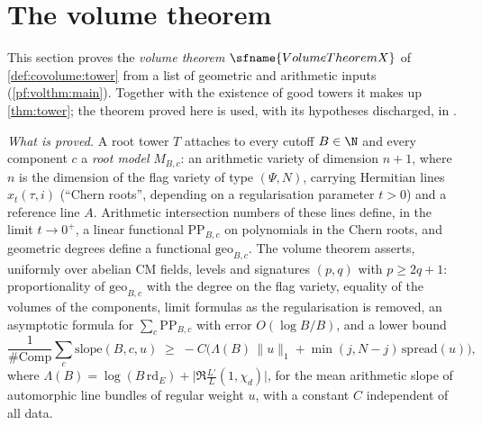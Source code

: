 \section{The volume theorem}\label{sec:pf:volthm}

\providecommand{\volthmdeg}{\deg_{\mathrm{Fl}}}
\providecommand{\volthmlin}{\mathrm{lin}}
\providecommand{\volthmfd}{\mathrm{fdeg}}
\providecommand{\volthmII}{\mathcal{I}}
\providecommand{\volthmhh}{h_{\mathrm{Fl}}}
\providecommand{\volthmSh}{\mathrm{Sh}}
\providecommand{\volthmTot}{\mathrm{Tot}}
\providecommand{\volthmPP}{\mathrm{PP}}
\providecommand{\volthmgap}{\mathrm{gap}}
\providecommand{\volthmR}{\mathcal{R}}
\providecommand{\volthmcoef}{\varpi}

This section proves the \emph{volume theorem} $\sfname{VolumeTheoremX}$ of \cref{def:covolume:tower}
from a list of geometric and arithmetic inputs (\cref{pf:volthm:main}). Together with the existence of
good towers it makes up \cref{thm:tower}; the theorem proved here is used, with its hypotheses discharged, in
.

\emph{What is proved.} A root tower $T$ attaches to every cutoff $B\in\N$ and every component $c$ a
\emph{root model} $M_{B,c}$: an arithmetic variety of dimension $n+1$, where $n$ is the dimension of the
flag variety of type $(\Psi,N)$, carrying Hermitian lines $x_t(\tau,i)$ (``Chern roots'', depending on a
regularisation parameter $t>0$) and a reference line $A$. Arithmetic intersection numbers of these lines
define, in the limit $t\to0^+$, a linear functional $\volthmPP_{B,c}$ on polynomials in the Chern roots, and
geometric degrees define a functional $\mathrm{geo}_{B,c}$. The volume theorem asserts, uniformly over abelian
CM fields, levels and signatures $(p,q)$ with $p\ge2q+1$: proportionality of $\mathrm{geo}_{B,c}$ with the
degree on the flag variety, equality of the volumes of the components, limit formulas as the regularisation
is removed, an asymptotic formula for $\sum_c\volthmPP_{B,c}$ with error $O(\log B/B)$, and a lower bound
\begin{equation}\label{pf:volthm:eq:intro}
\frac1{\#\mathrm{Comp}}\sum_c\mathrm{slope}(B,c,u)\;\ge\;-C\bigl(\Lambda(B)\,\|u\|_1+\min(j,N-j)\,\mathrm{spread}(u)\bigr),
\end{equation}
where $\Lambda(B)=\log(B\,\mathrm{rd}_E)+\bigl|\Re\tfrac{L'}{L}(1,\chi_d)\bigr|$,
for the mean arithmetic slope of automorphic line bundles of regular weight $u$, with a constant $C$ independent
of all data.

